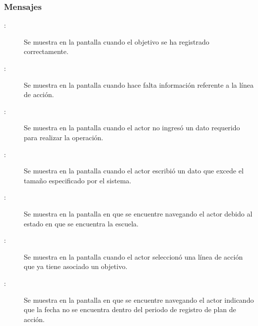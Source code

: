 \subsubsection{Mensajes}

\begin{description}

	\item[:] Se muestra en la pantalla  cuando el objetivo se ha registrado correctamente.
	\item[:] Se muestra en la pantalla  cuando hace falta información referente a la línea de acción.
	\item[:] Se muestra en la pantalla  cuando el actor no ingresó un dato requerido para realizar la operación.
	\item[:] Se muestra en la pantalla  cuando el actor escribió un dato que excede el tamaño especificado por el sistema.
	\item[:] Se muestra en la pantalla en que se encuentre navegando el actor debido al estado en que se encuentra la escuela.
	\item[:] Se muestra en la pantalla  cuando el actor seleccionó una línea de acción que ya tiene asociado un objetivo.	
	\item[:] Se muestra en la pantalla en que se encuentre navegando el actor indicando que la fecha no se encuentra dentro del periodo de registro de plan de acción.
\end{description}
